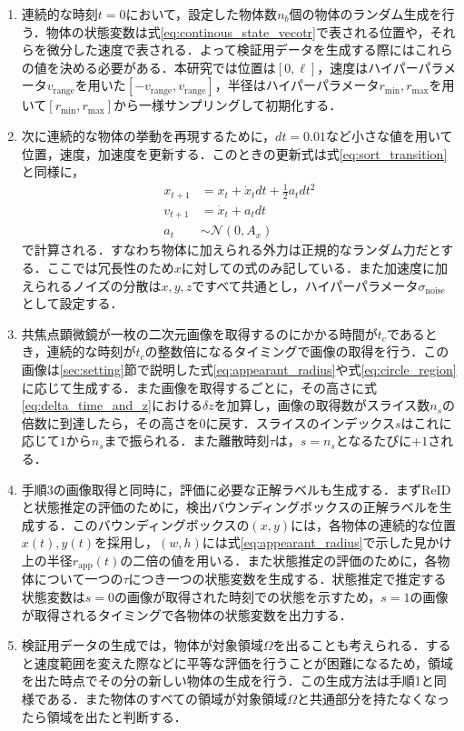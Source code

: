 \begin{enumerate}[label=手順\arabic*]
    \item 連続的な時刻$t=0$において，設定した物体数$n_b$個の物体のランダム生成を行う．物体の状態変数は式\ref{eq:continous_state_vecotr}で表される位置や，それらを微分した速度で表される．よって検証用データを生成する際にはこれらの値を決める必要がある．本研究では位置は$[0, \ell]$，速度はハイパーパラメータ$v_{\text{range}}$を用いた$[-v_{\text{range}}, v_{\text{range}}]$，半径はハイパーパラメータ$r_{\text{min}}, r_{\text{max}}$を用いて$[r_{\text{min}}, r_{\text{max}}]$から一様サンプリングして初期化する．
    \item 次に連続的な物体の挙動を再現するために，$dt=0.01$など小さな値を用いて位置，速度，加速度を更新する．このときの更新式は式\ref{eq:sort_transition}と同様に，
    \begin{equation}
        \label{eq:transition}
        \begin{aligned}
            x_{t+1} &= x_t + \dot{x}_t dt + \frac{1}{2} a_t dt^2
            \\v_{t+1} &= \dot{x}_t + a_t dt
            \\a_t &\sim \mathcal{N}(0, A_x)
        \end{aligned}
    \end{equation}
    で計算される．すなわち物体に加えられる外力は正規的なランダム力だとする．ここでは冗長性のため$x$に対しての式のみ記している．また加速度に加えられるノイズの分散は$x, y, z$ですべて共通とし，ハイパーパラメータ$\sigma_{\text{noise}}$として設定する．
    \item 共焦点顕微鏡が一枚の二次元画像を取得するのにかかる時間が$t_c$であるとき，連続的な時刻が$t_c$の整数倍になるタイミングで画像の取得を行う．この画像は\ref{sec:setting}節で説明した式\ref{eq:appearant_radius}や式\ref{eq:circle_region}に応じて生成する．また画像を取得するごとに，その高さに式\ref{eq:delta_time_and_z}における$\delta z$を加算し，画像の取得数がスライス数$n_s$の倍数に到達したら，その高さを$0$に戻す．スライスのインデックス$s$はこれに応じて$1$から$n_s$まで振られる．また離散時刻$\tau$は，$s=n_s$となるたびに$+1$される．
    \item 手順3の画像取得と同時に，評価に必要な正解ラベルも生成する．まずReIDと状態推定の評価のために，検出バウンディングボックスの正解ラベルを生成する．このバウンディングボックスの$(x, y)$には，各物体の連続的な位置$x(t), y(t)$を採用し，$(w, h)$には式\ref{eq:appearant_radius}で示した見かけ上の半径$r_{\text{app}}(t)$の二倍の値を用いる．また状態推定の評価のために，各物体について一つの$\tau$につき一つの状態変数を生成する．状態推定で推定する状態変数は$s = 0$の画像が取得された時刻での状態を示すため，$s = 1$の画像が取得されるタイミングで各物体の状態変数を出力する．
    \item 検証用データの生成では，物体が対象領域$\Omega$を出ることも考えられる．すると速度範囲を変えた際などに平等な評価を行うことが困難になるため，領域を出た時点でその分の新しい物体の生成を行う．この生成方法は手順1と同様である．また物体のすべての領域が対象領域$\Omega$と共通部分を持たなくなったら領域を出たと判断する．
\end{enumerate}


